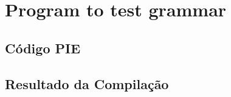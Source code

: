 \section{Program to test grammar}\label{seq:all}
\subsection{Código PIE}
\begin{footnotesize}
	
\end{footnotesize}
\subsection{Resultado da Compilação}
\begin{footnotesize}
	
\end{footnotesize}
